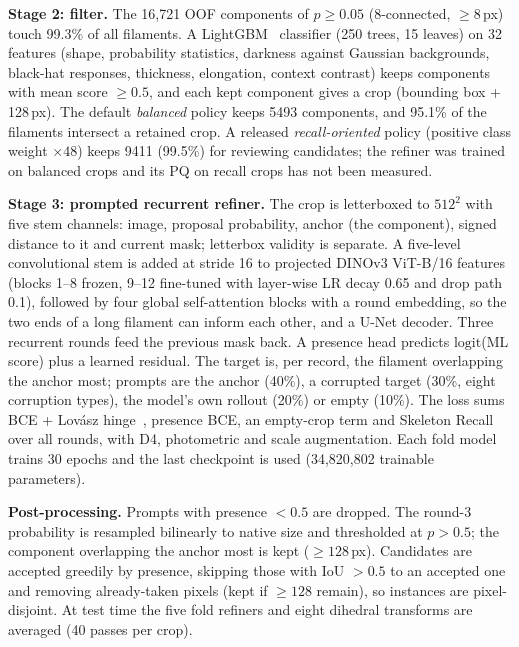 \documentclass[sigconf]{acmart}
\begin{document}
\textbf{Stage 2: filter.} The 16,721 OOF components of $p\ge0.05$ (8-connected, $\ge$8\,px) touch 99.3\% of all
filaments. A LightGBM~\cite{lgbm} classifier (250 trees, 15 leaves) on 32 features (shape, probability statistics,
darkness against Gaussian backgrounds, black-hat responses, thickness, elongation, context contrast) keeps components
with mean score $\ge0.5$, and each kept component gives a crop (bounding box + 128\,px). The default
\emph{balanced} policy keeps 5493 components, and 95.1\% of the filaments intersect a retained crop. A released
\emph{recall-oriented} policy (positive class weight $\times48$) keeps 9411 (99.5\%) for reviewing candidates; the
refiner was trained on balanced crops and its PQ on recall crops has not been measured.

\textbf{Stage 3: prompted recurrent refiner.} The crop is letterboxed to $512^2$ with five stem channels: image,
proposal probability, anchor (the component), signed distance to it and current mask; letterbox validity is separate.
A five-level convolutional stem is added at stride 16 to projected DINOv3 ViT-B/16 features (blocks 1--8 frozen,
9--12 fine-tuned with layer-wise LR decay 0.65 and drop path~\cite{droppath} 0.1), followed by four global
self-attention blocks with a round embedding, so the two ends of a long filament can inform each other, and a U-Net
decoder. Three recurrent rounds feed the previous mask back. A presence head predicts $\mathrm{logit}$(ML score) plus a
learned residual. The target is, per record, the filament overlapping the anchor most; prompts are the anchor (40\%),
a corrupted target (30\%, eight corruption types), the model's own rollout (20\%) or empty (10\%). The loss sums BCE +
Lov\'asz hinge~\cite{lovasz}, presence BCE, an empty-crop term and Skeleton Recall~\cite{skel} over all rounds, with
D4, photometric and scale augmentation. Each fold model trains 30 epochs and the last checkpoint is used
(34,820,802 trainable parameters).

\textbf{Post-processing.} Prompts with presence $<0.5$ are dropped. The round-3 probability is resampled bilinearly to
native size and thresholded at $p>0.5$; the component overlapping the anchor most is kept ($\ge128$\,px). Candidates
are accepted greedily by presence, skipping those with IoU $>0.5$ to an accepted one and removing already-taken pixels
(kept if $\ge128$ remain), so instances are pixel-disjoint. At test time the five fold refiners and eight dihedral
transforms are averaged (40 passes per crop).

\end{document}

